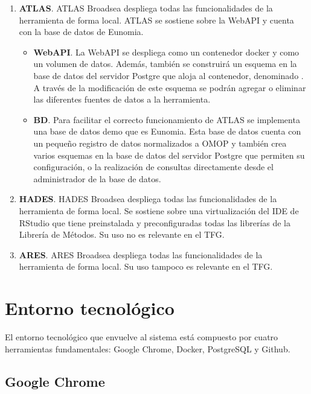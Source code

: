 \begin{enumerate}

    \item \textbf{ATLAS}. ATLAS Broadsea despliega todas las funcionalidades de la herramienta de forma local. ATLAS se sostiene sobre la WebAPI y cuenta con la base de datos de Eunomia.
    
    \begin{itemize}
        \item \textbf{WebAPI}. La WebAPI se despliega como un contenedor docker y como un volumen de datos. Además, también se construirá un esquema en la base de datos del servidor Postgre que aloja al contenedor, denominado . A través de la modificación de este esquema se podrán agregar o eliminar las diferentes fuentes de datos a la herramienta.
        \item \textbf{BD}. Para facilitar el correcto funcionamiento de ATLAS se implementa una base de datos demo que es Eunomia. Esta base de datos cuenta con un pequeño registro de datos normalizados a OMOP y también crea varios esquemas en la base de datos del servidor Postgre que permiten su configuración, o la realización de consultas directamente desde el administrador de la base de datos.
    \end{itemize}

    \item \textbf{HADES}. HADES Broadsea despliega todas las funcionalidades de la herramienta de forma local. Se sostiene sobre una virtualización del IDE de RStudio que tiene preinstalada y preconfiguradas todas las librerías de la Librería de Métodos. Su uso no es relevante en el TFG.
   
    \item \textbf{ARES}. ARES Broadsea despliega todas las funcionalidades de la herramienta de forma local. Su uso tampoco es relevante en el TFG.

\end{enumerate}



\section{Entorno tecnológico} \label{sec:07entorno}

El entorno tecnológico que envuelve al sistema está compuesto por cuatro herramientas fundamentales:  Google Chrome, Docker, PostgreSQL y Github.


\subsection{Google Chrome}

